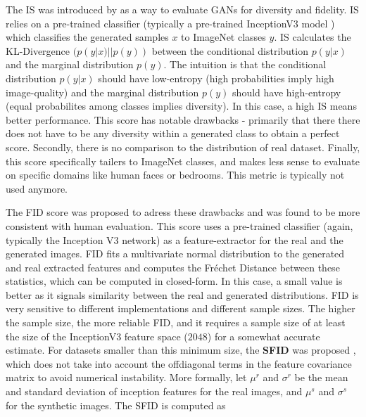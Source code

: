 The \ac{IS} was introduced by \cite{improved_techniques_gans} as a way to evaluate 
\ac{GAN}s for diversity and fidelity. \ac{IS} relies on a pre-trained classifier 
(typically a pre-trained InceptionV3 model \citep{szegedy2016rethinking}) which classifies the 
generated samples $x$ to ImageNet classes $y$. \ac{IS} calculates the \ac{KL}-Divergence $(p(y|x) || p(y))$ between the 
conditional distribution $p(y|x)$  and the marginal distribution $p(y)$.
The intuition 
is that the conditional distribution $p(y|x)$ should have low-entropy (high probabilities 
imply high image-quality)
and the marginal distribution $p(y)$ should have high-entropy (equal probabilites 
among classes implies diversity). In this case, 
a high \ac{IS} means better performance. This score has notable drawbacks - 
primarily that there there does not have to be any diversity within a generated class 
to obtain a perfect score. Secondly, there is no comparison to the distribution of 
real dataset. Finally, this score specifically tailers to ImageNet classes, and 
makes less sense to evaluate on specific domains like human faces or bedrooms. This metric
 is typically not used anymore.

\label{sec:related_fid}


The \ac{FID} score \citep{heusel2017gans} was proposed to adress these drawbacks and 
was found to be more consistent with human evaluation. This score uses a pre-trained 
classifier (again, typically the Inception V3 network) as a feature-extractor for the 
real and the generated images.  \ac{FID}
fits a multivariate normal distribution to the generated and real extracted features and 
computes the Fréchet Distance between these statistics, which can be computed in closed-form.
In this case, a small value is better as it signals similarity between the real and generated 
distributions. \ac{FID} is very sensitive to different implementations and different sample sizes. 
The higher the sample size, the more reliable \ac{FID}, and it requires a sample size of at least 
the size of the InceptionV3 feature space ($2048$) for a somewhat accurate estimate. 
For datasets smaller than this minimum size, the \textbf{\ac{SFID}} was proposed 
\citep{kim2020simplified}, which does
 not take into account the offdiagonal terms in the feature covariance matrix
 to avoid numerical instability. 
 More formally, let $\mu^r$ and $\sigma^r$ be the mean and standard deviation of 
inception features for the real images, and $\mu^s$ and $\sigma^s$ for the synthetic 
images. The \ac{SFID} \cite{kim2020simplified} is computed as 



